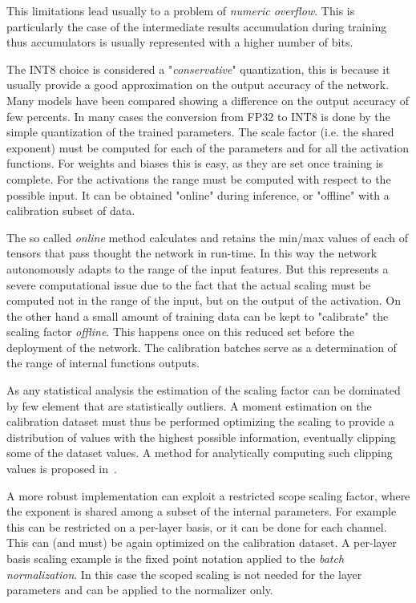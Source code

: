 This limitations lead usually to a problem of \textit{numeric overflow}. This is particularly the case of the intermediate results accumulation during training~\cite{courbariaux2014training} thus accumulators is usually represented with a higher number of bits.

The INT8 choice is considered a "\textit{conservative}" quantization, this is because it usually provide a good approximation on the output accuracy of the network. Many models have been compared showing a difference on the output accuracy of few percents. In many cases the conversion from FP32 to INT8 is done by the simple quantization of the trained parameters. The scale factor (i.e. the shared exponent) must be computed for each of the parameters and for all the activation functions.
For weights and biases this is easy, as they are set once training is complete. For the activations the range must be computed with respect to the possible input. It can be obtained "online" during inference, or "offline" with a calibration subset of data.

The so called \textit{online} method calculates and retains the min/max values of each of tensors that pass thought the network in run-time. In this way the network autonomously adapts to the range of the input features. 
But this represents a severe computational issue due to the fact that the actual scaling must be computed not in the range of the input, but on the output of the activation.
On the other hand a small amount of training data can be kept to "calibrate" the scaling factor \textit{offline}. This happens once on this reduced set before the deployment of the network. The calibration batches serve as a determination of the range of internal functions outputs.

As any statistical analysis the estimation of the scaling factor can be dominated by few element that are statistically outliers. A moment estimation on the calibration dataset must thus be performed optimizing the scaling to provide a distribution of values with the highest possible information, eventually clipping some of the dataset values.
A method for analytically computing such clipping values is proposed in~\cite{banner2018posttraining}.

A more robust implementation can exploit a restricted scope scaling factor, where the exponent is shared among a subset of the internal parameters. For example this can be restricted on a per-layer basis, or it can be done for each channel. This can (and must) be again optimized on the calibration dataset. 
A per-layer basis scaling example is the fixed point notation applied to the \textit{batch normalization}. In this case the scoped scaling is not needed for the layer parameters and can be applied to the normalizer only.

